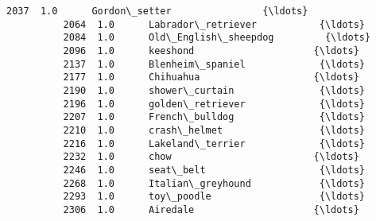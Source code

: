 \documentclass[11pt]{article}
\begin{document}
\begin{Verbatim}[commandchars=\\\{\}]
          2037  1.0      Gordon\_setter                {\ldots}       
          2064  1.0      Labrador\_retriever           {\ldots}       
          2084  1.0      Old\_English\_sheepdog         {\ldots}       
          2096  1.0      keeshond                     {\ldots}       
          2137  1.0      Blenheim\_spaniel             {\ldots}       
          2177  1.0      Chihuahua                    {\ldots}       
          2190  1.0      shower\_curtain               {\ldots}       
          2196  1.0      golden\_retriever             {\ldots}       
          2207  1.0      French\_bulldog               {\ldots}       
          2210  1.0      crash\_helmet                 {\ldots}       
          2216  1.0      Lakeland\_terrier             {\ldots}       
          2232  1.0      chow                         {\ldots}       
          2246  1.0      seat\_belt                    {\ldots}       
          2268  1.0      Italian\_greyhound            {\ldots}       
          2293  1.0      toy\_poodle                   {\ldots}       
          2306  1.0      Airedale                     {\ldots}       
          

\end{Verbatim}
\end{document}
